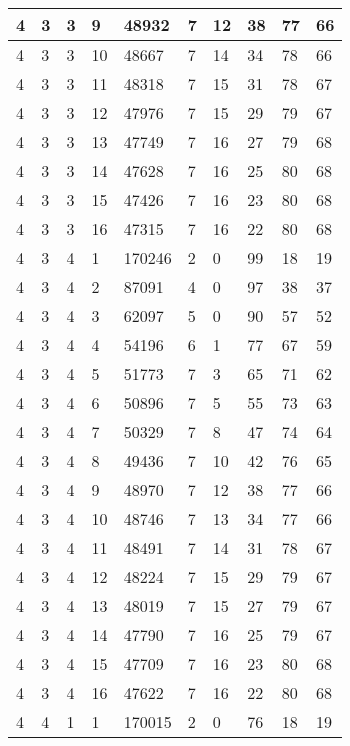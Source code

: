 \begin{table}[!ht]
\begin{tabular}{|l|l|l|l|l|l|l|l|l|l|}
        4 & 3 & 3 & 9 & 48932 & 7 & 12 & 38 & 77 & 66 \\ \hline
        4 & 3 & 3 & 10 & 48667 & 7 & 14 & 34 & 78 & 66 \\ \hline
        4 & 3 & 3 & 11 & 48318 & 7 & 15 & 31 & 78 & 67 \\ \hline
        4 & 3 & 3 & 12 & 47976 & 7 & 15 & 29 & 79 & 67 \\ \hline
        4 & 3 & 3 & 13 & 47749 & 7 & 16 & 27 & 79 & 68 \\ \hline
        4 & 3 & 3 & 14 & 47628 & 7 & 16 & 25 & 80 & 68 \\ \hline
        4 & 3 & 3 & 15 & 47426 & 7 & 16 & 23 & 80 & 68 \\ \hline
        4 & 3 & 3 & 16 & 47315 & 7 & 16 & 22 & 80 & 68 \\ \hline
        4 & 3 & 4 & 1 & 170246 & 2 & 0 & 99 & 18 & 19 \\ \hline
        4 & 3 & 4 & 2 & 87091 & 4 & 0 & 97 & 38 & 37 \\ \hline
        4 & 3 & 4 & 3 & 62097 & 5 & 0 & 90 & 57 & 52 \\ \hline
        4 & 3 & 4 & 4 & 54196 & 6 & 1 & 77 & 67 & 59 \\ \hline
        4 & 3 & 4 & 5 & 51773 & 7 & 3 & 65 & 71 & 62 \\ \hline
        4 & 3 & 4 & 6 & 50896 & 7 & 5 & 55 & 73 & 63 \\ \hline
        4 & 3 & 4 & 7 & 50329 & 7 & 8 & 47 & 74 & 64 \\ \hline
        4 & 3 & 4 & 8 & 49436 & 7 & 10 & 42 & 76 & 65 \\ \hline
        4 & 3 & 4 & 9 & 48970 & 7 & 12 & 38 & 77 & 66 \\ \hline
        4 & 3 & 4 & 10 & 48746 & 7 & 13 & 34 & 77 & 66 \\ \hline
        4 & 3 & 4 & 11 & 48491 & 7 & 14 & 31 & 78 & 67 \\ \hline
        4 & 3 & 4 & 12 & 48224 & 7 & 15 & 29 & 79 & 67 \\ \hline
        4 & 3 & 4 & 13 & 48019 & 7 & 15 & 27 & 79 & 67 \\ \hline
        4 & 3 & 4 & 14 & 47790 & 7 & 16 & 25 & 79 & 67 \\ \hline
        4 & 3 & 4 & 15 & 47709 & 7 & 16 & 23 & 80 & 68 \\ \hline
        4 & 3 & 4 & 16 & 47622 & 7 & 16 & 22 & 80 & 68 \\ \hline
        4 & 4 & 1 & 1 & 170015 & 2 & 0 & 76 & 18 & 19 \\ \hline

\end{tabular}
\end{table}
